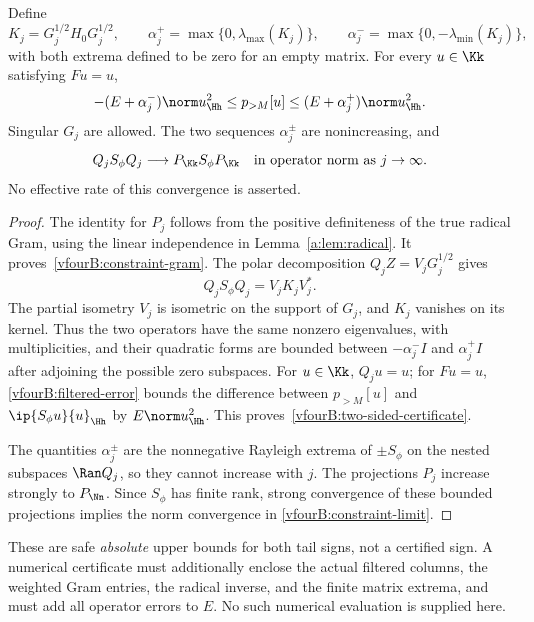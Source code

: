 \begin{theorem}
\label{vfourB:gram-certificate}
Define
\[
 K_j=G_j^{1/2}H_0G_j^{1/2},\qquad
 \alpha_j^+=\max\{0,\lambda_{\max}(K_j)\},\qquad
 \alpha_j^-=\max\{0,-\lambda_{\min}(K_j)\},
\]
with both extrema defined to be zero for an empty matrix. For every
$u\in\Kk$ satisfying $Fu=u$,
\begin{equation}\label{vfourB:two-sided-certificate}
 -(E+\alpha_j^-)\norm u_{\Hh}^2
 \le p_{>M}[u]\le(E+\alpha_j^+)\norm u_{\Hh}^2.
\end{equation}
Singular $G_j$ are allowed. The two sequences $\alpha_j^\pm$ are
nonincreasing, and
\begin{equation}\label{vfourB:constraint-limit}
 Q_jS_\phi Q_j\longrightarrow P_\Kk S_\phi P_\Kk
 \quad\hbox{in operator norm as }j\to\infty.
\end{equation}
No effective rate of this convergence is asserted.
\end{theorem}
\begin{proof}
The identity for $P_j$ follows from the positive definiteness of the
true radical Gram, using the linear independence in
Lemma~\ref{a:lem:radical}. It proves~\eqref{vfourB:constraint-gram}.
The polar decomposition $Q_jZ=V_jG_j^{1/2}$ gives
\[
 Q_jS_\phi Q_j=V_jK_jV_j^*.
\]
The partial isometry $V_j$ is isometric on the support of $G_j$, and
$K_j$ vanishes on its kernel. Thus the two operators have the same
nonzero eigenvalues, with multiplicities, and their quadratic forms are
bounded between $-\alpha_j^-I$ and $\alpha_j^+I$ after adjoining the
possible zero subspaces. For $u\in\Kk$, $Q_ju=u$; for $Fu=u$,
\eqref{vfourB:filtered-error} bounds the difference between
$p_{>M}[u]$ and $\ip{S_\phi u}{u}_{\Hh}$ by $E\norm u_{\Hh}^2$.
This proves~\eqref{vfourB:two-sided-certificate}.

The quantities $\alpha_j^\pm$ are the nonnegative Rayleigh extrema of
$\pm S_\phi$ on the nested subspaces $\Ran Q_j$, so they cannot increase
with $j$. The projections $P_j$ increase strongly to $P_\Nn$.
Since $S_\phi$ has finite rank, strong convergence of these bounded
projections implies the norm convergence in
\eqref{vfourB:constraint-limit}.
\end{proof}

These are safe \emph{absolute} upper bounds for both tail signs, not a
certified sign. A numerical certificate must additionally enclose the
actual filtered columns, the weighted Gram entries, the radical inverse,
and the finite matrix extrema, and must add all operator errors to $E$.
No such numerical evaluation is supplied here.


